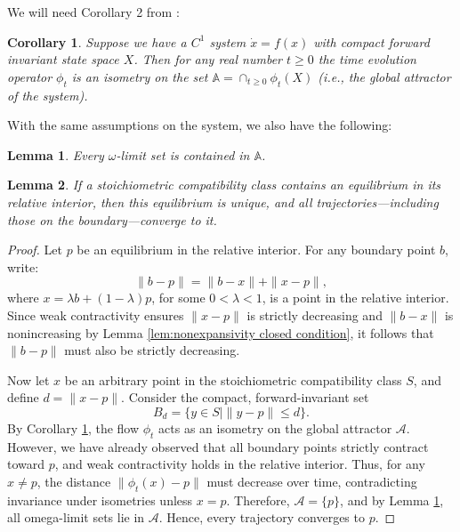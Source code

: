 \documentclass{article}
\newtheorem{cor}{Corollary}
\newtheorem{lem}{Lemma}
\newcommand{\gattract}{\mathbb{A}}
\begin{document}
We will need Corollary 2 from \cite{10886667}:

\begin{cor}
\label{cor:isometry on attractor}\cite{10886667}
    Suppose we have a $C^1$ system $\dot{x} = f(x)$ with compact forward invariant state space $X$. Then for any real number $t \geq 0$ the time evolution operator $\phi_t$ is an isometry on the set ${\gattract}  = \cap_{t\geq 0 } \phi_t(X)$ (i.e., the global attractor of the system).
\end{cor}

With the same assumptions on the system, we also have the following:

\begin{lem}
\label{lem:omega limit sets in global attractor}\cite{10886667}
    Every $\omega$-limit set is contained in ${\gattract}$.
\end{lem}


\begin{lem}
\label{lem:unique_equilibrium_relative_interior}
If a stoichiometric compatibility class contains an equilibrium in its relative interior, then this equilibrium is unique, and all trajectories—including those on the boundary—converge to it.
\end{lem}

\begin{proof}
Let \( p \) be an equilibrium in the relative interior. For any boundary point \( b \), write:
\[
\|b - p\| = \|b - x\| + \|x - p\|,
\]
where \( x = \lambda b + (1-\lambda) p \), for some $0 < \lambda < 1$, is a point in the relative interior. Since weak contractivity ensures \( \|x - p\| \) is strictly decreasing and $\|b-x\|$ is nonincreasing by Lemma \ref{lem:nonexpansivity closed condition}, it follows that \( \|b - p\| \) must also be strictly decreasing.

Now let \( x \) be an arbitrary point in the stoichiometric compatibility class \( S \), and define \( d = \|x - p\| \). Consider the compact, forward-invariant set
\[
B_d = \{ y \in S \mid \|y - p\| \leq d \}.
\]
By Corollary \ref{cor:isometry on attractor}, the flow \( \phi_t \) acts as an isometry on the global attractor \( \mathcal{A} \). However, we have already observed that all boundary points strictly contract toward \( p \), and weak contractivity holds in the relative interior. Thus, for any \( x \neq p \), the distance \( \| \phi_t(x) - p \| \) must decrease over time, contradicting invariance under isometries unless \( x = p \). Therefore, \( \mathcal{A} = \{p\} \), and by Lemma \ref{lem:omega limit sets in global attractor}, all omega-limit sets lie in \( \mathcal{A} \). Hence, every trajectory converges to \( p \).
\end{proof}
\end{document}
